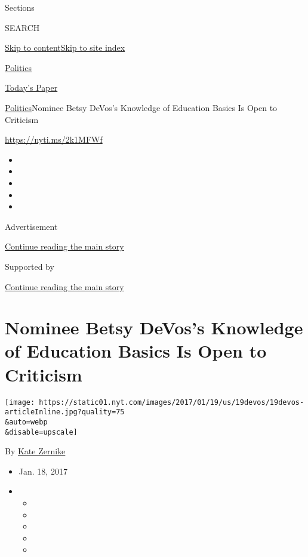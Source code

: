 Sections

SEARCH

\protect\hyperlink{site-content}{Skip to
content}\protect\hyperlink{site-index}{Skip to site index}

\href{https://www.nytimes.com/section/politics}{Politics}

\href{https://myaccount.nytimes.com/auth/login?response_type=cookie\&client_id=vi}{}

\href{https://www.nytimes.com/section/todayspaper}{Today's Paper}

\href{/section/politics}{Politics}\textbar{}Nominee Betsy DeVos's
Knowledge of Education Basics Is Open to Criticism

\url{https://nyti.ms/2k1MFWf}

\begin{itemize}
\item
\item
\item
\item
\item
\end{itemize}

Advertisement

\protect\hyperlink{after-top}{Continue reading the main story}

Supported by

\protect\hyperlink{after-sponsor}{Continue reading the main story}

\hypertarget{nominee-betsy-devoss-knowledge-of-education-basics-is-open-to-criticism}{%
\section{Nominee Betsy DeVos's Knowledge of Education Basics Is Open to
Criticism}\label{nominee-betsy-devoss-knowledge-of-education-basics-is-open-to-criticism}}

\texttt{[image: https://static01.nyt.com/images/2017/01/19/us/19devos/19devos-articleInline.jpg?quality=75\\\&auto=webp\\\&disable=upscale]}

By \href{http://www.nytimes.com/by/kate-zernike}{Kate Zernike}

\begin{itemize}
\item
  Jan. 18, 2017
\item
  \begin{itemize}
  \item
  \item
  \item
  \item
  \item
  \end{itemize}
\end{itemize}

